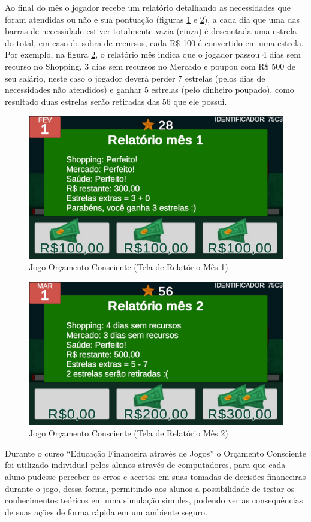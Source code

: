 Ao final do mês o jogador recebe um relatório detalhando as necessidades que foram atendidas ou não e sua pontuação (figuras \ref{fig: figura05-relatorio-01} e \ref{fig: figura06-relatorio-02}), a cada dia que uma das barras de necessidade estiver totalmente vazia (cinza) é descontada uma estrela do total, em caso de sobra de recursos, cada R\$ 100 é convertido em uma estrela. Por exemplo, na figura \ref{fig: figura06-relatorio-02}, o relatório mês indica que o jogador passou 4 dias sem recurso no Shopping, 3 dias sem recursos no Mercado e poupou com R\$ 500 de seu salário, neste caso o jogador deverá perder 7 estrelas (pelos dias de necessidades não atendidos) e ganhar 5 estrelas (pelo dinheiro poupado), como resultado duas estrelas serão retiradas das 56 que ele possui.

\graphicspath{{figuras/}}
\begin{figure}[!ht]
\centering
\begin{minipage}{1\linewidth}
\center
\caption{Jogo Orçamento Consciente (Tela de Relatório Mês 1)} \label{fig: figura05-relatorio-01}
\includegraphics[width=0.4\linewidth]{05-figura_relatorio-mes-1}
\end{minipage}
\end{figure}

\graphicspath{{figuras/}}
\begin{figure}[!ht]
\centering
\begin{minipage}{1\linewidth}
\center
\caption{Jogo Orçamento Consciente (Tela de Relatório Mês 2)} \label{fig: figura06-relatorio-02}
\includegraphics[width=0.4\linewidth]{06-figura_tela-relatorio-mes-2}
\end{minipage}
\end{figure}

Durante o curso “Educação Financeira através de Jogos” o Orçamento Consciente foi utilizado individual pelos alunos através de computadores, para que cada aluno pudesse perceber os erros e acertos em suas tomadas de decisões financeiras durante o jogo, dessa forma, permitindo aos alunos a possibilidade de testar os conhecimentos teóricos em uma simulação simples, podendo ver as consequências de suas ações de forma rápida em um ambiente seguro.

